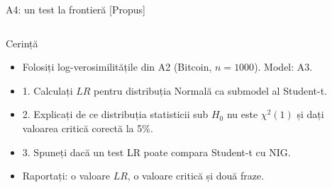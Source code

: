 \begin{frame}{A4: un test la frontieră [Propus]}
\propsub
\itemsize{\scriptsize}
\begin{columns}[T]
\begin{column}{\taskw}
\begin{block}{Cerință}
\begin{itemize}
    \item Folosiți log-verosimilitățile din A2 (Bitcoin, $n = 1000$). Model: A3.
    \item 1. Calculați $LR$ pentru distribuția Normală ca submodel al Student-t.
    \item 2. Explicați de ce distribuția statisticii sub $H_0$ nu este $\chi^2(1)$ și dați valoarea critică corectă la 5\%.
    \item 3. Spuneți dacă un test LR poate compara Student-t cu NIG.
    \item Raportați: o valoare $LR$, o valoare critică și două fraze.
\end{itemize}
\end{block}
\end{column}
\begin{column}{\solw}
\end{column}
\end{columns}
\end{frame}

